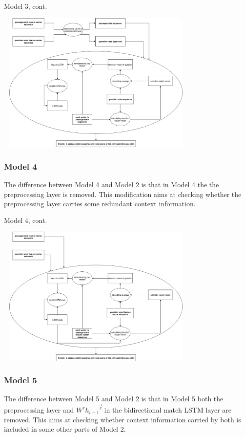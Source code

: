 \documentclass{beamer}
\begin{document}
\begin{frame}{Model 3, cont.}
    \begin{center}
        \includegraphics[width=10cm, height=7cm]{figures/model3_encoder.png}
    \end{center}
\end{frame}

\begin{frame} \frametitle{Model 4}
    The difference between Model 4 and Model 2 is that in Model 4 the the preprocessing layer is removed. This modification aims at checking whether the preprocessing layer carries some redundant context information.
\end{frame}

\begin{frame}{Model 4, cont.}
    \begin{center}
        \includegraphics[width=10cm, height=7cm]{figures/model4_encoder.png}
    \end{center}
\end{frame}

\begin{frame} \frametitle{Model 5}
    The difference between Model 5 and Model 2 is that in Model 5 both the preprocessing layer and $W^r\overrightarrow{{h_{i-1}}^r}$ in the bidirectional match LSTM layer are removed. This aims at checking whether context information carried by both is included in some other parts of Model 2.
\end{frame}
\end{document}
